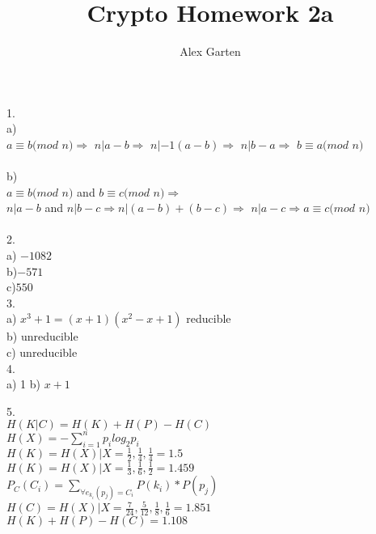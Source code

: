 \documentclass{article}
\begin{document}
\title{Crypto Homework 2a}
\author{Alex Garten}
\date{}

1.\\
a) \\
$a\equiv b (mod$ $n) \Rightarrow$
$n | a - b \Rightarrow$
$n | -1(a-b) \Rightarrow$
$n | b -a \Rightarrow$
$b\equiv a (mod$ $n) $ \\ \\
b) \\
$a\equiv b (mod$ $n)$ and $b\equiv c (mod$ $n) \Rightarrow$ \\
$n|a-b$ and $n|b-c \Rightarrow n|(a-b) + (b-c) \Rightarrow$
$n|a-c \Rightarrow a\equiv c (mod$ $n)$ \\ \\

2.\\
a) $-1082$ \\
b)$-571$ \\
c)$550$ \\

3.\\
a) $x^3+1 = (x+1)(x^2-x+1)$ reducible \\
b) unreducible \\
c) unreducible \\

4.\\
a) 1
b) $x + 1$

5.\\
$H(K|C) = H(K) + H(P) - H(C)$ \\
$H(X) = - \sum\limits_{i=1}^{n}p_ilog_2p_i$ \\
$H(K) = H(X) | X = \frac{1}{2}, \frac{1}{4}, \frac{1}{4} = 1.5$ \\
$H(K) = H(X) | X = \frac{1}{3}, \frac{1}{6}, \frac{1}{2} = 1.459$ \\
$P_C(C_i) = \sum\limits_{\forall e_{k_i}(p_j) = C_i}P(k_i)*P(p_j)$ \\
$H(C) = H(X) | X = \frac{7}{24}, \frac{5}{12}, \frac{1}{8}, \frac{1}{6} = 1.851$ \\
$H(K) + H(P) - H(C) = 1.108$
\end{document}
